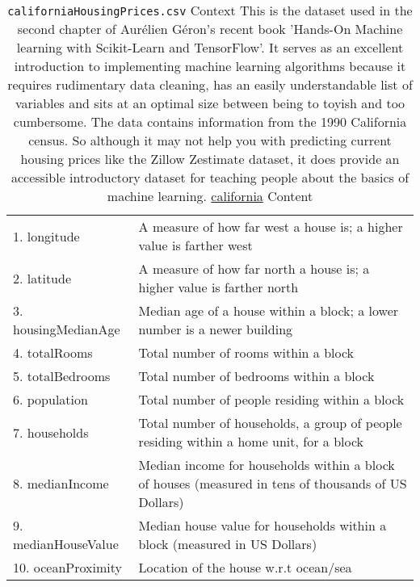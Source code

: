 \documentclass[12pt]{article}
\theoremstyle{remark}
\begin{document}
\begin{table}
	\caption{ \texttt{californiaHousingPrices.csv}
Context
This is the dataset used in the second chapter of Aurélien Géron's recent book 'Hands-On Machine learning with Scikit-Learn and TensorFlow'. It serves as an excellent introduction to implementing machine learning algorithms because it requires rudimentary data cleaning, has an easily understandable list of variables and sits at an optimal size between being to toyish and too cumbersome.
The data contains information from the 1990 California census. So although it may not help you with predicting current housing prices like the Zillow Zestimate dataset, it does provide an accessible introductory dataset for teaching people about the basics of machine learning.
\href{ https://www.kaggle.com/datasets/camnugent/california-housing-prices?select=housing.csv}{california} Content
}
	\begin{tabular}{l|l}\hline
1. longitude & A measure of how far west a house is; a higher value is farther west \\
2. latitude & A measure of how far north a house is; a higher value is farther north\\
3. housingMedianAge & Median age of a house within a block; a lower number is a newer building\\
4. totalRooms& Total number of rooms within a block\\
5. totalBedrooms & Total number of bedrooms within a block\\
6. population &  Total number of people residing within a block\\
7. households &  Total number of households, a group of people residing within a home unit, for a block \\
8. medianIncome &  Median income for households within a block of houses (measured in tens of thousands of US Dollars)\\
9. medianHouseValue &  Median house value for households within a block (measured in US Dollars)\\
10. oceanProximity & Location of the house w.r.t ocean/sea\\
	\hline
	\end{tabular}
\end{table}
\end{document}
